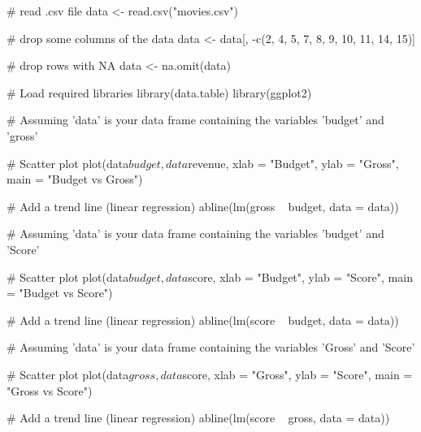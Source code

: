 # read .csv file
data <- read.csv("movies.csv")
 
# drop some columns of the data
data <- data[, -c(2, 4, 5, 7, 8, 9, 10, 11, 14, 15)]

# drop rows with NA
data <- na.omit(data)
    
# Load required libraries
library(data.table)
library(ggplot2)

# Assuming 'data' is your data frame containing the variables 'budget' and 'gross'

 # Scatter plot 
plot(data$budget, data$revenue, xlab = "Budget", ylab = "Gross", main = "Budget vs Gross")

# Add a trend line (linear regression)  
abline(lm(gross ~ budget, data = data))



# Assuming 'data' is your data frame containing the variables 'budget' and 'Score'

# Scatter plot 
plot(data$budget, data$score, xlab = "Budget", ylab = "Score", main = "Budget vs Score")

# Add a trend line (linear regression)  
abline(lm(score ~ budget, data = data))



# Assuming 'data' is your data frame containing the variables 'Gross' and 'Score'

# Scatter plot 
plot(data$gross, data$score, xlab = "Gross", ylab = "Score", main = "Gross vs Score")

# Add a trend line (linear regression)  
abline(lm(score ~ gross, data = data))
